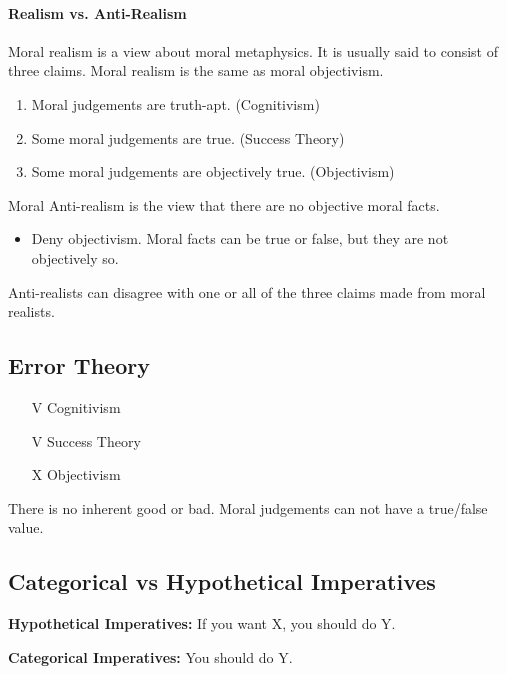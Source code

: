 \documentclass[12pt]{article}
\begin{document}
\paragraph{Realism vs. Anti-Realism}

Moral realism is a view about moral metaphysics. It is usually said to consist of three claims. Moral realism is the same as moral objectivism.
\begin{enumerate}
    \item Moral judgements are truth-apt. (Cognitivism)
    \item Some moral judgements are true. (Success Theory)
    \item Some moral judgements are objectively true. (Objectivism)
\end{enumerate}

Moral Anti-realism is the view that there are no objective moral facts.
\begin{itemize}
    \item Deny objectivism. Moral facts can be true or false, but they are not objectively so.
\end{itemize}

Anti-realists can disagree with one or all of the three claims made from moral realists.

\subsection{Error Theory}

\begin{itemize}
    \item [V] Cognitivism
    \item [V] Success Theory
    \item [X] Objectivism
\end{itemize}

There is no inherent good or bad. Moral judgements can not have a true/false value.

\subsection{Categorical vs Hypothetical Imperatives}

\noindent

\textbf{Hypothetical Imperatives:} If you want X, you should do Y.

\textbf{Categorical Imperatives:} You should do Y.
\end{document}
